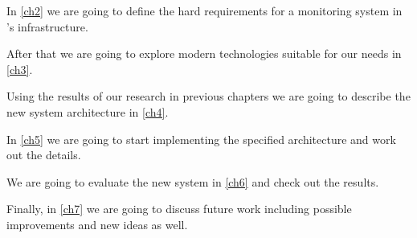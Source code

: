 In \autoref{ch2} we are going to define the hard requirements for a monitoring
system in \kszk's infrastructure.

After that we are going to explore modern technologies suitable for our needs
in \autoref{ch3}.

Using the results of our research in previous chapters we are going to describe
the new system architecture in \autoref{ch4}.

In \autoref{ch5} we are going to start implementing the specified architecture
and work out the details. 

We are going to evaluate the new system in \autoref{ch6} and check out the
results.

Finally, in \autoref{ch7} we are going to discuss future work including
possible improvements and new ideas as well.
